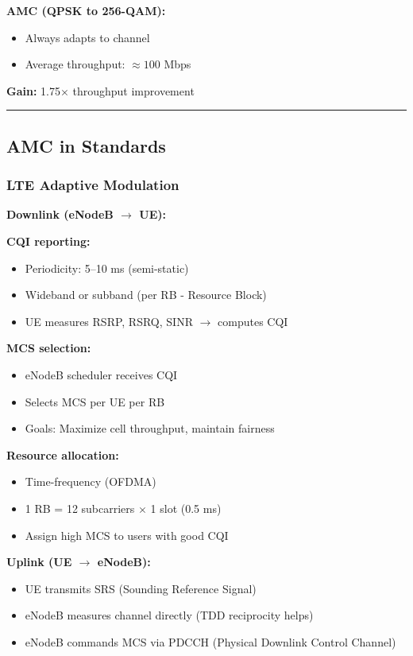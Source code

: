 \textbf{AMC (QPSK to 256-QAM):}
\begin{itemize}
\item Always adapts to channel
\item Average throughput: $\approx 100$ Mbps
\end{itemize}

\textbf{Gain:} 1.75$\times$ throughput improvement

\begin{center}\rule{0.5\linewidth}{0.5pt}\end{center}

\subsection{AMC in Standards}\label{amc-in-standards}

\subsubsection{LTE Adaptive Modulation}\label{lte-adaptive-modulation}

\textbf{Downlink (eNodeB $\rightarrow$ UE):}

\textbf{CQI reporting:}
\begin{itemize}
\item Periodicity: 5--10 ms (semi-static)
\item Wideband or subband (per RB - Resource Block)
\item UE measures RSRP, RSRQ, SINR $\rightarrow$ computes CQI
\end{itemize}

\textbf{MCS selection:}
\begin{itemize}
\item eNodeB scheduler receives CQI
\item Selects MCS per UE per RB
\item Goals: Maximize cell throughput, maintain fairness
\end{itemize}

\textbf{Resource allocation:}
\begin{itemize}
\item Time-frequency (OFDMA)
\item 1 RB = 12 subcarriers $\times$ 1 slot (0.5 ms)
\item Assign high MCS to users with good CQI
\end{itemize}

\textbf{Uplink (UE $\rightarrow$ eNodeB):}
\begin{itemize}
\item UE transmits SRS (Sounding Reference Signal)
\item eNodeB measures channel directly (TDD reciprocity helps)
\item eNodeB commands MCS via PDCCH (Physical Downlink Control Channel)
\end{itemize}


